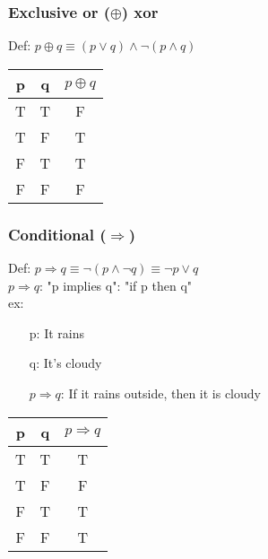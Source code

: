 \documentclass{article}
\begin{document}
\subsubsection{Exclusive or ($\oplus $) xor}
Def: $p \oplus q \equiv (p \lor q) \land \lnot (p \land q)$

\begin{table}[h!]
    \begin{center}
        \begin{tabular}{c|c|c}
            p & q & $p \oplus q$ \\
            \hline
            T & T & F            \\
            T & F & T            \\
            F & T & T            \\
            F & F & F
        \end{tabular}
    \end{center}
\end{table}

\subsubsection{Conditional ($\Rightarrow $)}
Def: $p \Rightarrow q \equiv \lnot (p \land \lnot q) \equiv\lnot p \lor q$\\
$p \Rightarrow q$: "p implies q": "if p then q"\\
ex:
\begin{itemize}
    \item [p:] It rains
    \item [q:] It's cloudy
    \item [$p \Rightarrow q$:] If it rains outside, then it is cloudy
\end{itemize}

\begin{table}[h!]
    \begin{center}
        \begin{tabular}{c|c|c}
            p & q & $p \Rightarrow q$ \\
            \hline
            T & T & T                 \\
            T & F & F                 \\
            F & T & T                 \\
            F & F & T
        \end{tabular}
    \end{center}
\end{table}
\end{document}
